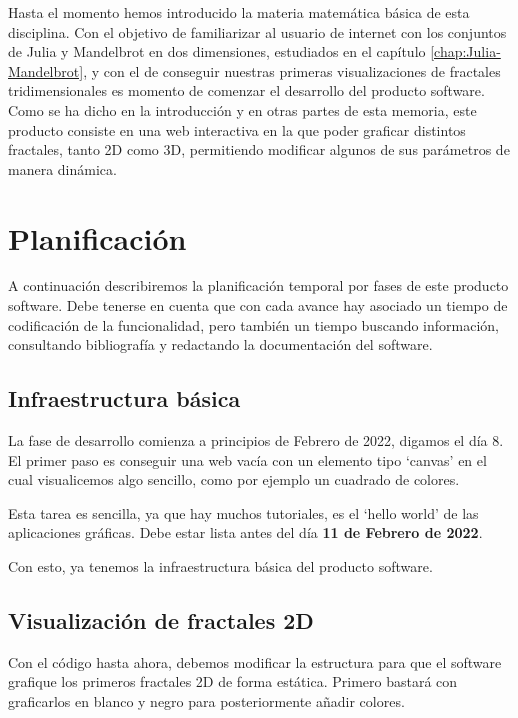 %
%

Hasta el momento hemos introducido la materia matemática básica de esta disciplina. Con el objetivo de familiarizar al usuario de internet con los conjuntos de Julia y Mandelbrot en dos dimensiones, estudiados en el capítulo \ref{chap:Julia-Mandelbrot}, y con el de conseguir nuestras primeras visualizaciones de fractales tridimensionales es momento de comenzar el desarrollo del producto software. Como se ha dicho en la introducción y en otras partes de esta memoria, este producto consiste en una web interactiva en la que poder graficar distintos fractales, tanto 2D como 3D, permitiendo modificar algunos de sus parámetros de manera dinámica.  

\section*{Planificación}

A continuación describiremos la planificación temporal por fases de este producto software. Debe tenerse en cuenta que con cada avance hay asociado un tiempo de codificación de la funcionalidad, pero también un tiempo buscando información, consultando bibliografía y redactando la documentación del software.

\subsection*{Infraestructura básica}

La fase de desarrollo comienza a principios de Febrero de 2022, digamos el día 8. El primer paso es conseguir una web vacía con un elemento tipo `canvas' en el cual visualicemos algo sencillo, como por ejemplo un cuadrado de colores.

Esta tarea es sencilla, ya que hay muchos tutoriales, es el `hello world' de las aplicaciones gráficas. Debe estar lista antes del día \textbf{11 de Febrero de 2022}.

Con esto, ya tenemos la infraestructura básica del producto software.

\subsection*{Visualización de fractales 2D}

Con el código hasta ahora, debemos modificar la estructura para que el software grafique los primeros fractales 2D de forma estática. Primero bastará con graficarlos en blanco y negro para posteriormente añadir colores.

